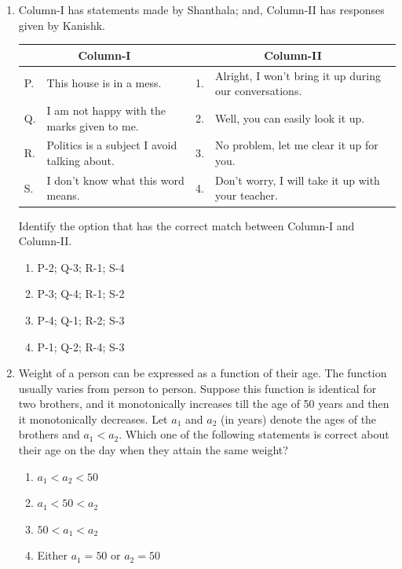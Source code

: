 \documentclass[journal]{IEEEtran}
\begin{document}
\begin{enumerate}
\item Column-I has statements made by Shanthala; and, Column-II has responses given by Kanishk.
\begin{center}
\begin{tabular}{|l|p{5cm}|l|p{5cm}|}
\hline
\multicolumn{2}{|c|}{\textbf{Column-I}} & \multicolumn{2}{c|}{\textbf{Column-II}} \\
\hline
P. & This house is in a mess. & 1. & Alright, I won't bring it up during our conversations. \\
\hline
Q. & I am not happy with the marks given to me. & 2. & Well, you can easily look it up. \\
\hline
R. & Politics is a subject I avoid talking about. & 3. & No problem, let me clear it up for you. \\
\hline
S. & I don't know what this word means. & 4. & Don't worry, I will take it up with your teacher. \\
\hline
\end{tabular}
\end{center}
Identify the option that has the correct match between Column-I and Column-II.
\hfill{}
\begin{enumerate}
\item P-2; Q-3; R-1; S-4
\item P-3; Q-4; R-1; S-2
\item P-4; Q-1; R-2; S-3
\item P-1; Q-2; R-4; S-3
\end{enumerate}

\item Weight of a person can be expressed as a function of their age. The function usually varies from person to person. Suppose this function is identical for two brothers, and it monotonically increases till the age of 50 years and then it monotonically decreases. Let $a_1$ and $a_2$ (in years) denote the ages of the brothers and $a_1 < a_2$. Which one of the following statements is correct about their age on the day when they attain the same weight?
\hfill{}
\begin{enumerate}
\item $a_1 < a_2 < 50$
\item $a_1 < 50 < a_2$
\item $50 < a_1 < a_2$
\item Either $a_1=50$ or $a_2=50$
\end{enumerate}


\end{enumerate}
\end{document}
